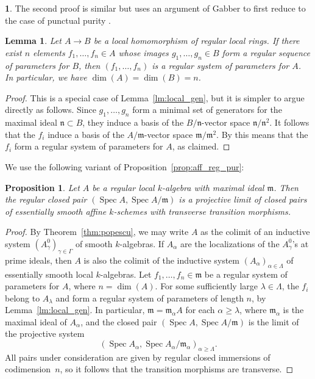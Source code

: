 \documentclass[JEP,XML,SOM,Unicode]{cedram}
\DeclareMathOperator{\spec}{Spec}
\newtheorem{prop}[thm]{Proposition}
\newtheorem{lm}[thm]{Lemma}
\theoremstyle{remark}
\theoremstyle{definition}
\newtheorem{num}[thm]{}
\numberwithin{equation}{thm}
\begin{document}
\begin{num}
The second proof is similar but uses an argument of Gabber to first reduce to the case of punctual purity \cite[XVI\,3.2]{Gabber}.

\begin{lm}\label{lm:local_gen_max}
Let $A \to B$ be a local homomorphism of regular local rings.
If there exist $n$ elements $f_1,\ldots,f_n \in A$ whose images $g_1,\ldots,g_n \in B$ form a regular sequence of parameters for $B$, then $(f_1,\ldots,f_n)$ is a regular system of parameters for $A$.
In particular, we have $\dim(A) = \dim(B) = n$.
\end{lm}

\begin{proof}
This is a special case of Lemma~\ref{lm:local_gen}, but it is simpler to argue directly as follows.
Since $g_1,\ldots,g_n$ form a minimal set of generators for the maximal ideal $\mathfrak{n} \subset B$, they induce a basis of the $B/\mathfrak{n}$-vector space $\mathfrak{n}/\mathfrak{n}^2$.
It follows that the $f_i$ induce a basis of the $A/\mathfrak{m}$-vector space $\mathfrak{m}/\mathfrak{m}^2$.
By \cite[0, Prop.\,17.1.7]{EGA4} this means that the $f_i$ form a regular system of parameters for $A$, as claimed.
\end{proof}

We use the following variant of Proposition~\ref{prop:aff_reg_pur}:
\begin{prop}
\label{prop:local_pur}
Let $A$ be a regular local $k$-algebra with maximal ideal $\mathfrak{m}$. Then the regular closed pair $(\spec A, \spec A/\mathfrak{m})$ is a projective limit of closed pairs of essentially smooth affine $k$-schemes with transverse transition morphisms.
\end{prop}
\begin{proof}
By Theorem~\ref{thm:popescu}, we may write $A$ as the colimit of an inductive system $(A^0_\gamma)_{\gamma\in\Gamma}$ of smooth $k$-algebras.
If $A_\alpha$ are the localizations of the $A^0_\gamma$'s at prime ideals, then $A$ is also the colimit of the inductive system $(A_\alpha)_{\alpha\in\Lambda}$ of essentially smooth local $k$-algebras.
Let $f_1,\ldots,f_n \in \mathfrak{m}$ be a regular system of parameters for $A$, where $n = \dim(A)$.
For some sufficiently large $\lambda\in\Lambda$, the $f_i$ belong to $A_\lambda$ and form a regular system of parameters of length $n$, by Lemma~\ref{lm:local_gen}.
In particular, $\mathfrak{m} = \mathfrak{m}_\alpha A$ for each $\alpha\geqslant\lambda$, where $\mathfrak{m}_\alpha$ is the maximal ideal of $A_\alpha$, and the closed pair $(\spec{A}, \spec{A}/\mathfrak{m})$ is the limit of the projective system
\begin{equation*}
(\spec{A_\alpha}, \spec{A_\alpha}/\mathfrak{m}_\alpha)_{\alpha\geqslant\Lambda}.
\end{equation*}
All pairs under consideration are given by regular closed immersions of codimension~$n$, so it follows that the transition morphisms are transverse.
\end{proof}


\end{num}
\end{document}

